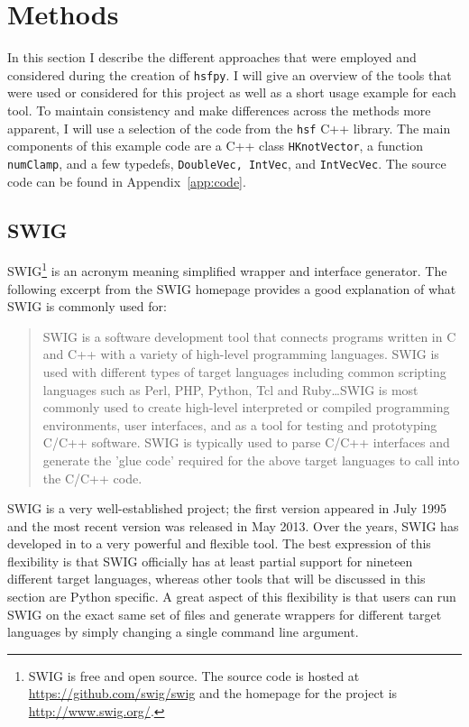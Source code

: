 
\section{Methods} \label{sec:methods}

In this section I describe the different approaches that were employed and considered during the creation of \texttt{hsfpy}. I will give an overview of the tools that were used or considered for this project as well as a short usage example for each tool. To maintain consistency and make differences across the methods more apparent, I will use a selection of the code from the \texttt{hsf} C++ library. The main components of this example code are a C++ class \texttt{HKnotVector}, a function \texttt{numClamp}, and a few typedefs, \texttt{DoubleVec, IntVec}, and \texttt{IntVecVec}. The source code can be found in Appendix~\ref{app:code}.

\subsection{SWIG} \label{sub:swig}

  SWIG\footnote{SWIG is free and open source. The source code is hosted at \url{https://github.com/swig/swig} and the homepage for the project is \url{http://www.swig.org/}.} is an acronym meaning simplified wrapper and interface generator. The following excerpt from the SWIG homepage provides a good explanation of what SWIG is commonly used for:

  \begin{quote}
    SWIG is a software development tool that connects programs written in C and C++ with a variety of high-level programming languages. SWIG is used with different types of target languages including common scripting languages such as Perl, PHP, Python, Tcl and Ruby\ldots SWIG is most commonly used to create high-level interpreted or compiled programming environments, user interfaces, and as a tool for testing and prototyping C/C++ software. SWIG is typically used to parse C/C++ interfaces and generate the 'glue code' required for the above target languages to call into the C/C++ code.
  \end{quote}
  \mainstretch{}

  \noindent  SWIG is a very well-established project; the first version appeared in July 1995 and the most recent version was released in May 2013. Over the years, SWIG has developed in to a very powerful and flexible tool. The best expression of this flexibility is that SWIG officially has at least partial support for nineteen different target languages, whereas other tools that will be discussed in this section are Python specific. A great aspect of this flexibility is that users can run SWIG on the exact same set of files and generate wrappers for different target languages by simply changing a single command line argument.

